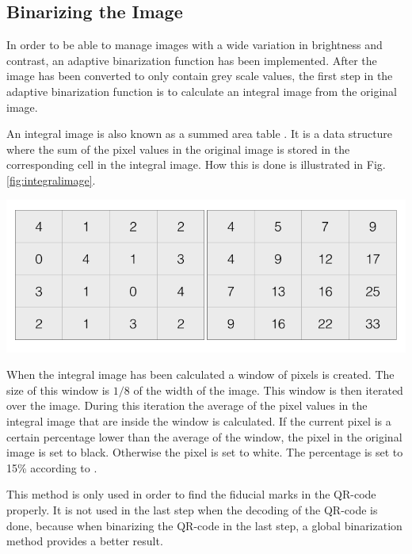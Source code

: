 \documentclass[12pt,a4paper]{article}
\newenvironment{Figure}
  {\par\medskip\noindent\minipage{\linewidth}}
  {\endminipage\par\medskip}
\begin{document}
\subsection{Binarizing the Image}
In order to be able to manage images with a wide variation in brightness and contrast, an adaptive binarization function has been implemented. After the image has been converted to only contain grey scale values, the first step in the adaptive binarization function is to calculate an integral image from the original image.

An integral image is also known as a summed area table \cite{bradley}. It is a data structure where the sum of the pixel values in the original image is stored in the corresponding cell in the integral image. How this is done is illustrated in Fig.\ref{fig:integralimage}.
\begin{Figure}
  \centering
    \includegraphics[width=1\linewidth]{./img/Integralimage.png}
\end{Figure}

When the integral image has been calculated a window of pixels is created. The size of this window is $1/8$ of the width of the image. This window is then iterated over the image. During this iteration the average of the pixel values in the integral image that are inside the window is calculated. If the current pixel is a certain percentage lower than the average of the window, the pixel in the original image is set to black. Otherwise the pixel is set to white. The percentage is set to 15\% according to \cite{bradley}. 

This method is only used in order to find the fiducial marks in the QR-code properly. It is not used in the last step when the decoding of the QR-code is done, because when binarizing the QR-code in the last step, a global binarization method provides a better result.
\end{document}
